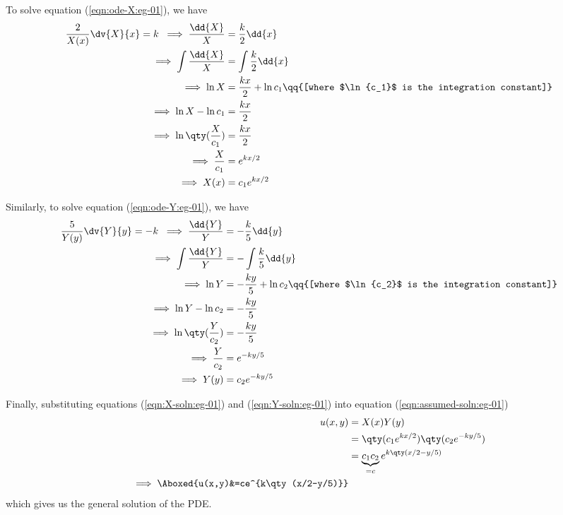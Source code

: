 \begin{enumerate}
            To solve equation (\ref{eqn:ode-X:eg-01}), we have
            \begin{align}
                \dfrac{2}{X(x)}\dv{X}{x}=k\;\implies\dfrac{\dd{X}}{X}&=\dfrac{k}{2}\dd{x} \nonumber\\
                \implies\int{\dfrac{\dd{X}}{X}}&=\int{\dfrac{k}{2}\dd{x}} \nonumber\\
                \implies\ln{X}&=\dfrac{kx}{2}+\ln{c_1}\qq{[where $\ln{c_1}$ is the integration constant]} \nonumber\\
                \implies\ln{X}-\ln{c_1}&=\dfrac{kx}{2} \nonumber\\
                \implies\ln\qty(\dfrac{X}{c_1})&=\dfrac{kx}{2} \nonumber\\
                \implies\dfrac{X}{c_1}&=e^{kx/2} \nonumber\\
                \implies X(x)&=c_1e^{kx/2} \label{eqn:X-soln:eg-01}
            \end{align}

            Similarly, to solve equation (\ref{eqn:ode-Y:eg-01}), we have
            \begin{align}
                \dfrac{5}{Y(y)}\dv{Y}{y}=-k\;\implies\dfrac{\dd{Y}}{Y}&=-\dfrac{k}{5}\dd{y} \nonumber\\
                \implies\int{\dfrac{\dd{Y}}{Y}}&=-\int{\dfrac{k}{5}\dd{y}} \nonumber\\
                \implies\ln{Y}&=-\dfrac{ky}{5}+\ln{c_2}\qq{[where $\ln{c_2}$ is the integration constant]} \nonumber\\
                \implies\ln{Y}-\ln{c_2}&=-\dfrac{ky}{5} \nonumber\\
                \implies\ln\qty(\dfrac{Y}{c_2})&=-\dfrac{ky}{5} \nonumber\\
                \implies\dfrac{Y}{c_2}&=e^{-ky/5} \nonumber\\
                \implies Y(y)&=c_2e^{-ky/5} \label{eqn:Y-soln:eg-01}
            \end{align}

            Finally, substituting equations (\ref{eqn:X-soln:eg-01}) and (\ref{eqn:Y-soln:eg-01}) into equation (\ref{eqn:assumed-soln:eg-01})
            \begin{align*}
                u(x,y)&=X(x)Y(y) \\
                    &=\qty(c_1e^{kx/2})\qty(c_2e^{-ky/5}) \\
                    &=\underbrace{c_1c_2}_{=c}e^{k\qty(x/2-y/5)} \\
                \implies \Aboxed{u(x,y)&=ce^{k\qty(x/2-y/5)}}
            \end{align*}
            which gives us the general solution of the PDE.


\end{enumerate}

